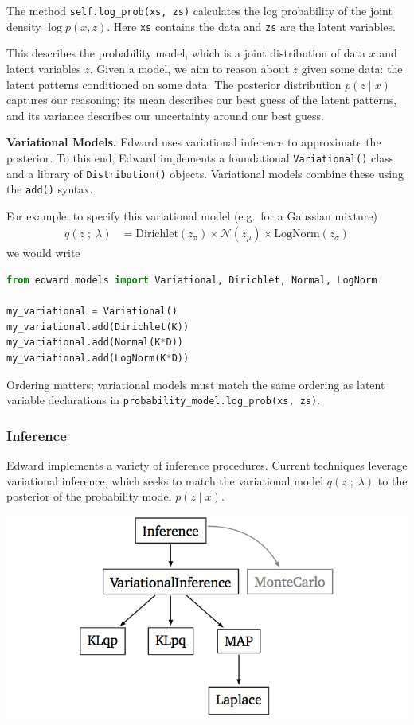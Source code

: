 The method \texttt{self.log_prob(xs, zs)} calculates the log probability of the
joint density $\log p(x,z)$. Here \texttt{xs} contains the data and \texttt{zs}
are the latent variables.

This describes the probability model, which is a joint distribution of data $x$
and latent variables $z$. Given a model, we aim to reason about $z$ given some
data: the latent patterns conditioned on some data. The posterior distribution
$p(z \mid x)$ captures our reasoning: its mean describes our best guess of the
latent patterns, and its variance describes our uncertainty around our best
guess. 

\textbf{Variational Models.}
Edward uses variational inference to approximate the posterior. To this end,
Edward implements a foundational \texttt{Variational()} class and a library of
\texttt{Distribution()} objects. Variational models combine these using
the \texttt{add()} syntax.

For example, to specify this variational model (e.g.~for a Gaussian mixture)
\begin{align*}
  q(z \;;\; \lambda) 
  &=
  \text{Dirichlet}(z_\pi)
  \times
  \mathcal{N}(z_\mu)
  \times
  \text{LogNorm}(z_\sigma)
\end{align*}
we would write
\begin{lstlisting}[language=Python]
from edward.models import Variational, Dirichlet, Normal, LogNorm

my_variational = Variational()
my_variational.add(Dirichlet(K))
my_variational.add(Normal(K*D))
my_variational.add(LogNorm(K*D))
\end{lstlisting}
Ordering matters; variational models must match the same ordering as latent
variable declarations in \texttt{probability_model.log_prob(xs, zs)}.

\subsubsection{Inference}\label{inference}

Edward implements a variety of inference procedures. Current techniques
leverage variational inference, which seeks to match the variational model
$q(z \;;\; \lambda)$ to the posterior of the probability model 
$p(z \mid x)$.

\includegraphics{images/inference_structure.png}

